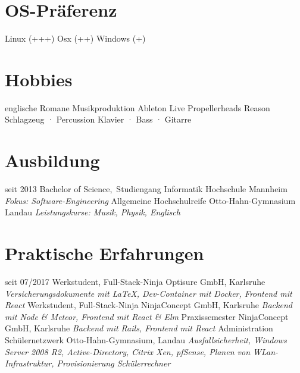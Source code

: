 \documentclass[]{friggeri-cv}
\begin{document}
\begin{aside}
  \section{OS-Präferenz}
  Linux {\footnotesize{(+++)}}
  Osx {\footnotesize{(++)}}
  Windows {\footnotesize{(+)}}
  \section{Hobbies}
    englische Romane
    Musikproduktion
    {\footnotesize Ableton Live
    Propellerheads Reason
    Schlagzeug · Percussion
    Klavier · Bass · Gitarre}
\end{aside}

\section{Ausbildung}

\begin{entrylist}
  \entry
    {seit 2013}
    {Bachelor of Science{\normalfont ,~Studiengang Informatik}}
    {Hochschule Mannheim}
    {\emph{Fokus: Software-Engineering}}
  \entry
    {}
    {Allgemeine Hochschulreife {\normalfont }}
    {Otto-Hahn-Gymnasium Landau}
    {\emph{Leistungskurse: Musik, Physik, Englisch}}
\end{entrylist}

\section{Praktische Erfahrungen}

\begin{entrylist}
  \entry
    {seit 07/2017}
    {Werkstudent, Full-Stack-Ninja}
    {Optisure GmbH, Karlsruhe}
    {\emph{Versicherungsdokumente mit \LaTeX, Dev-Container mit Docker, Frontend mit React}}
  \entry
    {}
    {Werkstudent, Full-Stack-Ninja}
    {NinjaConcept GmbH, Karlsruhe}
    {\emph{Backend mit Node \& Meteor, Frontend mit React \& Elm}}
  \entry
    {}
    {Praxissemester}
    {NinjaConcept GmbH, Karlsruhe}
    {\emph{Backend mit Rails, Frontend mit React}}
  \entry
    {}
    {Administration Schülernetzwerk}
    {Otto-Hahn-Gymnasium, Landau}
    {\emph{Ausfallsicherheit, Windows Server 2008 R2, Active-Directory, Citrix Xen, pfSense, Planen von WLan-Infrastruktur, Provisionierung Schülerrechner}}
\end{entrylist}
\end{document}
